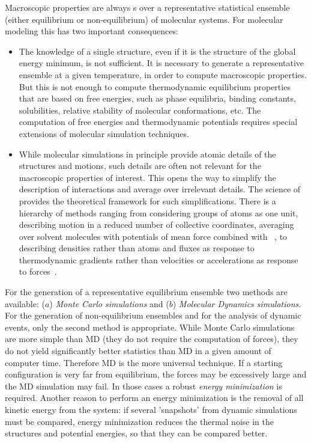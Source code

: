 Macroscopic properties are always s over a 
representative statistical ensemble (either equilibrium or 
non-equilibrium) of molecular systems. For molecular modeling this has 
two important consequences:
\begin{itemize}
\item   The knowledge of a single structure, even if it is the structure 
        of the global energy minimum, is not sufficient. It is necessary to 
        generate a representative ensemble at a given temperature, in order to 
        compute macroscopic properties. But this is not enough to compute 
        thermodynamic equilibrium properties that are based on free energies, 
        such as phase equilibria, binding constants, solubilities,  relative 
        stability of molecular conformations, etc. The computation of free 
        energies and thermodynamic potentials requires special extensions of 
        molecular simulation techniques.
\item   While molecular simulations in principle provide atomic details 
        of the structures and motions, such details are often not relevant for 
        the macroscopic properties of interest. This opens the way to simplify 
        the description of interactions and average over irrelevant details. 
        The science of  
        provides the theoretical framework 
        for such simplifications. There is a hierarchy of methods ranging from 
        considering groups of atoms as one unit, describing motion in a 
        reduced 
        number of collective coordinates, averaging over solvent molecules 
        with 
        potentials of mean force combined with 
        ~\cite{Gunsteren90}, to {\em 
        } 
        describing densities rather than atoms and fluxes 
        as response to thermodynamic gradients rather than velocities or 
        accelerations as response to forces~\cite{Fraaije93}.
\end{itemize}

For the generation of a representative equilibrium ensemble two methods 
are available: ($a$) {\em Monte Carlo simulations} and ($b$) {\em Molecular 
Dynamics simulations}. For the generation of non-equilibrium ensembles 
and for the analysis of dynamic events, only the second method is 
appropriate. While Monte Carlo simulations are more simple than MD (they 
do not require the computation of forces), they do not yield 
significantly better statistics than MD in a given amount of computer time. 
Therefore MD is the more universal technique. If a starting 
configuration is very far from equilibrium, the forces may be 
excessively large and the MD simulation may fail. In those cases a 
robust {\em energy minimization} is required. Another reason to perform 
an energy minimization is the removal of all kinetic energy from the 
system: if several 'snapshots' from dynamic simulations must be compared, 
energy minimization reduces the thermal noise in the structures and  
potential energies,  so that they can be compared better.


